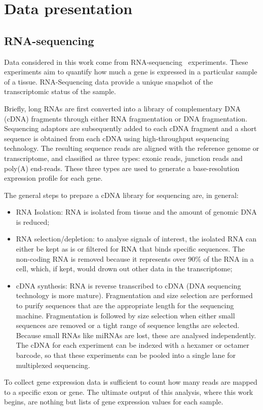\chapter{Data presentation}\label{ch:data}
\section{RNA-sequencing}\label{sec:rnaseq}
Data considered in this work come from RNA-sequencing~\cite{wang2009rna} experiments. These experiments aim to quantify how much a gene is expressed in a particular sample of a tissue. RNA-Sequencing data provide a unique snapshot of the transcriptomic status of the sample. 

Briefly, long RNAs are first converted into a library of complementary DNA (cDNA) fragments through either RNA fragmentation or DNA fragmentation. Sequencing adaptors are subsequently added to each cDNA fragment and a short sequence is obtained from each cDNA using high-throughput sequencing technology. The resulting sequence reads are aligned with the reference genome or transcriptome, and classified as three types: exonic reads, junction reads and poly(A) end-reads. These three types are used to generate a base-resolution expression profile for each gene.

The general steps to prepare a cDNA library for sequencing are, in general:
\begin{itemize}
\item RNA Isolation: RNA is isolated from tissue and the amount of genomic DNA is reduced;
\item RNA selection/depletion: to analyse signals of interest, the isolated RNA can either be kept as is or filtered for RNA that binds specific sequences. The non-coding RNA is removed because it represents over 90$\%$ of the RNA in a cell, which, if kept, would drown out other data in the transcriptome;
\item cDNA synthesis: RNA is reverse transcribed to cDNA (DNA sequencing technology is more mature). Fragmentation and size selection are performed to purify sequences that are the appropriate length for the sequencing machine.  Fragmentation is followed by size selection when either small sequences are removed or a tight range of sequence lengths are selected. Because small RNAs like miRNAs are lost, these are analysed independently. The cDNA for each experiment can be indexed with a hexamer or octamer barcode, so that these experiments can be pooled into a single lane for multiplexed sequencing.
\end{itemize}
To collect gene expression data is sufficient to count how many reads are mapped to a specific exon or gene. The ultimate output of this analysis, where this work begins, are nothing but lists of gene expression values for each sample.
